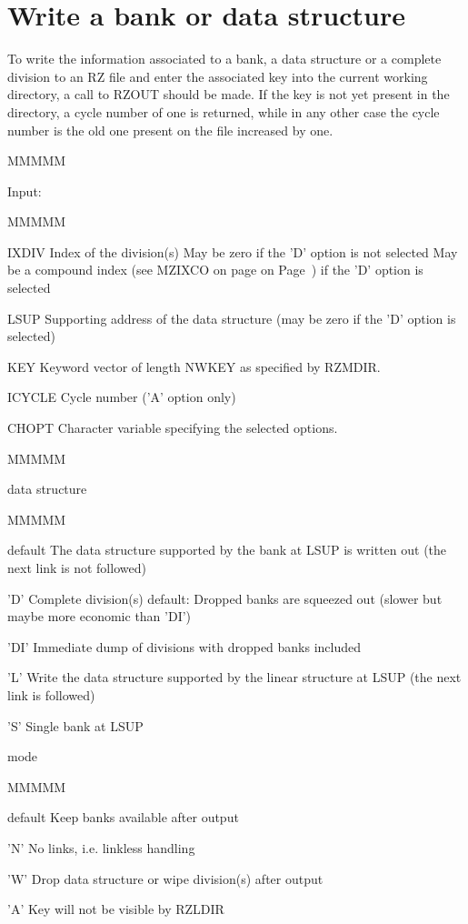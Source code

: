 \section{Write a bank or data structure}
\par To write the information associated to a bank,
a data structure or a complete division to an RZ file and enter the
associated key
into the current working directory, a call to RZOUT should be made.
If the key is not yet present in the directory, a cycle number of
one is returned, while in any other case the cycle number is the old
one present on the file increased by one.
\begin{DL}{MMMMM}
\item[Input:
]
\begin{DL}{MMMMM}
\item[IXDIV
]Index of the division(s)
\newline May be zero if the 'D' option is not selected
\newline May be a compound index
(see MZIXCO on page on Page~\pageref{MZIXCO FORM=PAGEONLY})
if the 'D' option is selected
\item[LSUP
]Supporting address
of the data structure (may be zero if the 'D' option is selected)
\item[KEY
]Keyword vector of length NWKEY as specified by RZMDIR.
\item[ICYCLE
]Cycle number ('A' option only)
\item[CHOPT
]Character variable specifying the selected options.
\begin{DL}{MMMMM}
\item[data structure
]
\begin{DL}{MMMMM}
\item[default
]The data structure supported by the bank at
LSUP is written out (the next link is not followed)
\item['D'
]Complete division(s)
\newline default: Dropped banks are squeezed out
\newline          (slower but maybe more economic than 'DI')
\item['DI'
]Immediate dump of divisions with dropped banks included
\item['L'
]Write the data structure supported by the linear structure at LSUP
(the next link is followed)
\item['S'
]Single bank at LSUP
\end{DL}
\item[mode
]
\begin{DL}{MMMMM}
\item[default
]Keep banks available after output
\item['N'
]No links, i.e. linkless handling
\item['W'
]Drop data structure or wipe division(s) after output
\item['A'
]Key will not be visible by RZLDIR
\end{DL}
\end{DL}
\end{DL}
\end{DL}
